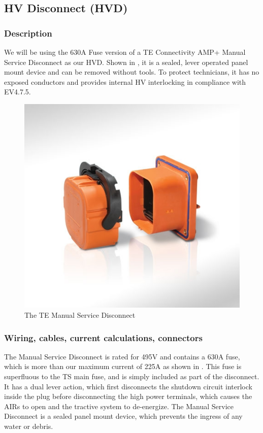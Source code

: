 \documentclass{article}
\begin{document}
\subsection{HV Disconnect (HVD)}\label{hv_disconnect}
\subsubsection{Description}
We will be using the 630A Fuse version of a TE Connectivity AMP+ Manual Service Disconnect as our HVD. Shown in , it is a sealed, lever operated panel mount device and can be removed without tools. To protect technicians, it has no exposed conductors and provides internal HV interlocking in compliance with EV4.7.5. 

\begin{figure}[H]
\centering
\includegraphics[scale=.7]{TE_Manual_Service_Disconnect.jpg}
\caption{The TE Manual Service Disconnect}
\label{fig:TE_MSD}
\end{figure}

\subsubsection{Wiring, cables, current calculations, connectors}
The Manual Service Disconnect is rated for 495V and contains a 630A fuse, which is more than our maximum current of 225A as shown in . This fuse is superfluous to the TS main fuse, and is simply included as part of the disconnect.  It has a dual lever action, which first disconnects the shutdown circuit interlock inside the plug before disconnecting the high power terminals, which causes the AIRs to open and the tractive system to de-energize. The Manual Service Disconnect is a sealed panel mount device, which prevents the ingress of any water or debris. \\
\end{document}
